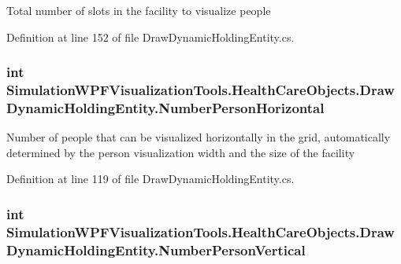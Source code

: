 Total number of slots in the facility to visualize people 



Definition at line 152 of file Draw\+Dynamic\+Holding\+Entity.\+cs.

\subsubsection[{\texorpdfstring{Number\+Person\+Horizontal}{NumberPersonHorizontal}}]{\setlength{\rightskip}{0pt plus 5cm}int Simulation\+W\+P\+F\+Visualization\+Tools.\+Health\+Care\+Objects.\+Draw\+Dynamic\+Holding\+Entity.\+Number\+Person\+Horizontal\hspace{0.3cm}{\ttfamily [get]}}\hypertarget{class_simulation_w_p_f_visualization_tools_1_1_health_care_objects_1_1_draw_dynamic_holding_entity_af063da806201586f9075b6ac59cf0cf5}{}\label{class_simulation_w_p_f_visualization_tools_1_1_health_care_objects_1_1_draw_dynamic_holding_entity_af063da806201586f9075b6ac59cf0cf5}


Number of people that can be visualized horizontally in the grid, automatically determined by the person visualization width and the size of the facility 



Definition at line 119 of file Draw\+Dynamic\+Holding\+Entity.\+cs.

\subsubsection[{\texorpdfstring{Number\+Person\+Vertical}{NumberPersonVertical}}]{\setlength{\rightskip}{0pt plus 5cm}int Simulation\+W\+P\+F\+Visualization\+Tools.\+Health\+Care\+Objects.\+Draw\+Dynamic\+Holding\+Entity.\+Number\+Person\+Vertical\hspace{0.3cm}{\ttfamily [get]}}\hypertarget{class_simulation_w_p_f_visualization_tools_1_1_health_care_objects_1_1_draw_dynamic_holding_entity_adb083146ee3a520a2d1bbd19520e3b7a}{}\label{class_simulation_w_p_f_visualization_tools_1_1_health_care_objects_1_1_draw_dynamic_holding_entity_adb083146ee3a520a2d1bbd19520e3b7a}


